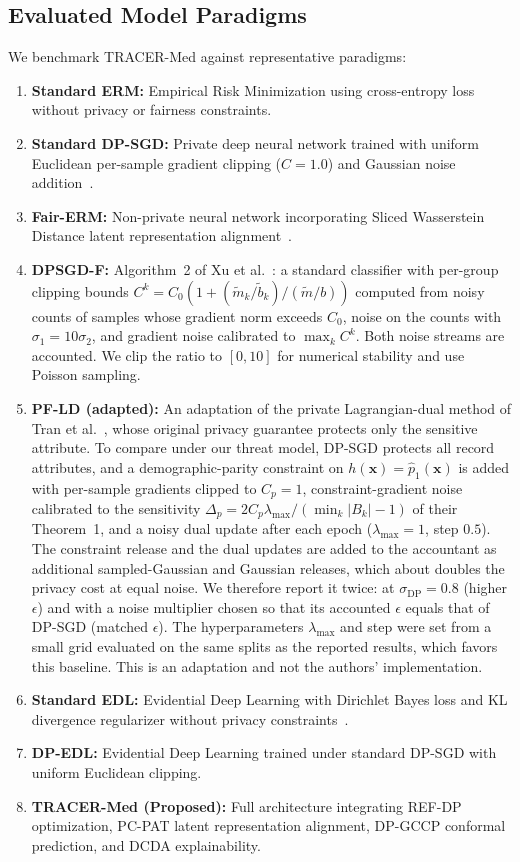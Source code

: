 \documentclass[3p,12pt]{elsarticle}
\theoremstyle{plain}
\theoremstyle{definition}
\begin{document}
\subsection{Evaluated Model Paradigms}
We benchmark TRACER-Med against representative paradigms:
\begin{enumerate}
    \item \textbf{Standard ERM:} Empirical Risk Minimization using cross-entropy loss without privacy or fairness constraints.
    \item \textbf{Standard DP-SGD:} Private deep neural network trained with uniform Euclidean per-sample gradient clipping ($C=1.0$) and Gaussian noise addition~\cite{abadi2016deep}.
    \item \textbf{Fair-ERM:} Non-private neural network incorporating Sliced Wasserstein Distance latent representation alignment~\cite{bonneel2015sliced}.
    \item \textbf{DPSGD-F:} Algorithm~2 of Xu et al.~\cite{xu2021removing}: a standard classifier with per-group clipping bounds $C^k = C_0(1 + (\tilde{m}_k/\tilde{b}_k)/(\tilde{m}/b))$ computed from noisy counts of samples whose gradient norm exceeds $C_0$, noise on the counts with $\sigma_1 = 10\sigma_2$, and gradient noise calibrated to $\max_k C^k$. Both noise streams are accounted. We clip the ratio to $[0, 10]$ for numerical stability and use Poisson sampling.
    \item \textbf{PF-LD (adapted):} An adaptation of the private Lagrangian-dual method of Tran et al.~\cite{tran2021differentially}, whose original privacy guarantee protects only the sensitive attribute. To compare under our threat model, DP-SGD protects all record attributes, and a demographic-parity constraint on $h(\mathbf{x}) = \hat{p}_1(\mathbf{x})$ is added with per-sample gradients clipped to $C_p = 1$, constraint-gradient noise calibrated to the sensitivity $\Delta_p = 2C_p\lambda_{\max}/(\min_k |B_k| - 1)$ of their Theorem~1, and a noisy dual update after each epoch ($\lambda_{\max} = 1$, step $0.5$). The constraint release and the dual updates are added to the accountant as additional sampled-Gaussian and Gaussian releases, which about doubles the privacy cost at equal noise. We therefore report it twice: at $\sigma_{\text{DP}} = 0.8$ (higher $\epsilon$) and with a noise multiplier chosen so that its accounted $\epsilon$ equals that of DP-SGD (matched $\epsilon$). The hyperparameters $\lambda_{\max}$ and step were set from a small grid evaluated on the same splits as the reported results, which favors this baseline. This is an adaptation and not the authors' implementation.
    \item \textbf{Standard EDL:} Evidential Deep Learning with Dirichlet Bayes loss and KL divergence regularizer without privacy constraints~\cite{sensoy2018evidential}.
    \item \textbf{DP-EDL:} Evidential Deep Learning trained under standard DP-SGD with uniform Euclidean clipping.
    \item \textbf{TRACER-Med (Proposed):} Full architecture integrating REF-DP optimization, PC-PAT latent representation alignment, DP-GCCP conformal prediction, and DCDA explainability.
\end{enumerate}
\end{document}
